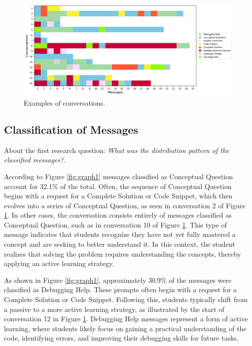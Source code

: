 \documentclass[a4paper,twoside]{article}
\begin{document}
\begin{figure}[htbp]
  \centering
  \includegraphics[scale=0.52]{img/figure2.png}
  \caption{Examples of conversations.}
  \label{fig:graph2}
\end{figure}

\subsection{Classification of Messages}

About the first research question: \textit{What was the distribution pattern of
the classified messages?.}

According to Figure \ref{fig:graph1} messages classified as
Conceptual Question account for 32.1\% of the total. Often, the sequence of
Conceptual Question begins with a request for a Complete Solution or Code
Snippet, which then evolves into a series of Conceptual Question, as seen in
conversation 2 of Figure \ref{fig:graph2}. In other cases, the conversation
consists entirely of messages classified as Conceptual Question, such as in
conversation 10 of Figure \ref{fig:graph2}. This type of message indicates that
students recognize they have not yet fully mastered a concept and are seeking to
better understand it. In this context, the student realizes that solving the
problem requires understanding the concepts, thereby applying an active learning
strategy.

As shown in Figure \ref{fig:graph1}, approximately 30.9\% of the messages were
classified as Debugging Help. These prompts often begin with a request for a
Complete Solution or Code Snippet. Following this, students typically shift
from a passive to a more active learning strategy, as illustrated by the start
of conversation 12 in Figure \ref{fig:graph2}. Debugging Help messages represent
a form of active learning, where students likely focus on gaining a practical
understanding of the code, identifying errors, and improving their debugging
skills for future tasks.
\end{document}
